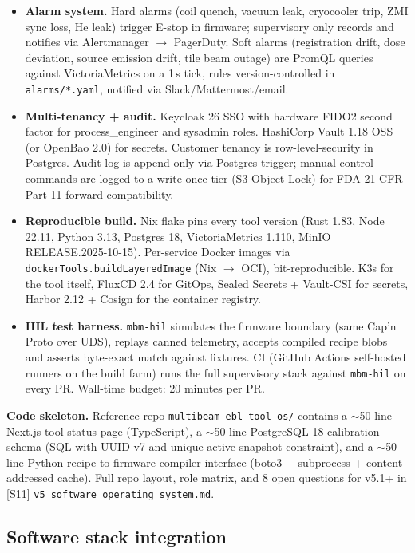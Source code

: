 \documentclass[11pt,letterpaper]{article}
\begin{document}
\begin{itemize}[leftmargin=1.6em]
  \item \textbf{Alarm system.} Hard alarms (coil quench, vacuum leak, cryocooler trip, ZMI sync loss, He leak) trigger E-stop in firmware; supervisory only records and notifies via Alertmanager $\to$ PagerDuty. Soft alarms (registration drift, dose deviation, source emission drift, tile beam outage) are PromQL queries against VictoriaMetrics on a 1\,s tick, rules version-controlled in \texttt{alarms/*.yaml}, notified via Slack/Mattermost/email.
  \item \textbf{Multi-tenancy + audit.} Keycloak 26 SSO with hardware FIDO2 second factor for process\_engineer and sysadmin roles. HashiCorp Vault 1.18 OSS (or OpenBao 2.0) for secrets. Customer tenancy is row-level-security in Postgres. Audit log is append-only via Postgres trigger; manual-control commands are logged to a write-once tier (S3 Object Lock) for FDA 21 CFR Part 11 forward-compatibility.
  \item \textbf{Reproducible build.} Nix flake pins every tool version (Rust 1.83, Node 22.11, Python 3.13, Postgres 18, VictoriaMetrics 1.110, MinIO RELEASE.2025-10-15). Per-service Docker images via \texttt{dockerTools.buildLayeredImage} (Nix $\to$ OCI), bit-reproducible. K3s for the tool itself, FluxCD 2.4 for GitOps, Sealed Secrets + Vault-CSI for secrets, Harbor 2.12 + Cosign for the container registry.
  \item \textbf{HIL test harness.} \texttt{mbm-hil} simulates the firmware boundary (same Cap'n Proto over UDS), replays canned telemetry, accepts compiled recipe blobs and asserts byte-exact match against fixtures. CI (GitHub Actions self-hosted runners on the build farm) runs the full supervisory stack against \texttt{mbm-hil} on every PR. Wall-time budget: 20 minutes per PR.
\end{itemize}

\textbf{Code skeleton.} Reference repo \texttt{multibeam-ebl-tool-os/} contains a $\sim$50-line Next.js tool-status page (TypeScript), a $\sim$50-line PostgreSQL 18 calibration schema (SQL with UUID v7 and unique-active-snapshot constraint), and a $\sim$50-line Python recipe-to-firmware compiler interface (boto3 + subprocess + content-addressed cache). Full repo layout, role matrix, and 8 open questions for v5.1+ in [S11] \texttt{v5\_software\_operating\_system.md}.

\subsection{Software stack integration}
\end{document}

